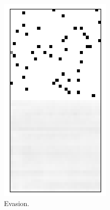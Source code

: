 \begin{figure}[t!]
	\centering
	\begin{subfigure}{0.3\columnwidth}
		\centering
		\includegraphics[width=\linewidth]{documentation/report/img/cvae_scroll_evasion.png}
		\caption{Evasion.}
		\label{subfig:cvae_scroll_race}
	\end{subfigure}%
	~ 
	\begin{subfigure}{0.3\columnwidth}

\end{subfigure}
\end{figure}
